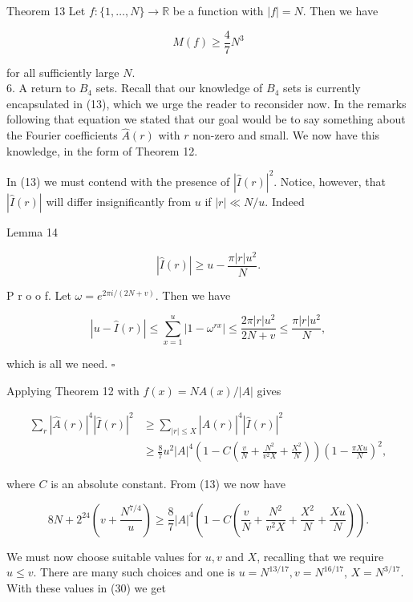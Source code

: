 \documentclass[10pt]{article}
\begin{document}
Theorem 13 Let $f:\{1, \ldots, N\} \rightarrow \mathbb{R}$ be a function with $|f|=N$. Then we have

$$
M(f) \geq \frac{4}{7} N^{3}
$$

for all sufficiently large $N$.\\
6. A return to $B_{4}$ sets. Recall that our knowledge of $B_{4}$ sets is currently encapsulated in (13), which we urge the reader to reconsider now. In the remarks following that equation we stated that our goal would be to say something about the Fourier coefficients $\hat{A}(r)$ with $r$ non-zero and small. We now have this knowledge, in the form of Theorem 12.

In (13) we must contend with the presence of $|\hat{I}(r)|^{2}$. Notice, however, that $|\hat{I}(r)|$ will differ insignificantly from $u$ if $|r| \ll N / u$. Indeed

Lemma 14

$$
|\hat{I}(r)| \geq u-\frac{\pi|r| u^{2}}{N} .
$$

P r o o f. Let $\omega=e^{2 \pi i /(2 N+v)}$. Then we have

$$
|u-\hat{I}(r)| \leq \sum_{x=1}^{u}\left|1-\omega^{r x}\right| \leq \frac{2 \pi|r| u^{2}}{2 N+v} \leq \frac{\pi|r| u^{2}}{N},
$$

which is all we need. \(\square\)

Applying Theorem 12 with $f(x)=N A(x) /|A|$ gives

$$
\begin{aligned}
\sum_{r}|\hat{A}(r)|^{4}|\hat{I}(r)|^{2} & \geq \sum_{|r| \leq X}|\hat{A}(r)|^{4}|\hat{I}(r)|^{2} \\
& \geq \frac{8}{7} u^{2}|A|^{4}\left(1-C\left(\frac{v}{N}+\frac{N^{2}}{v^{2} X}+\frac{X^{2}}{N}\right)\right)\left(1-\frac{\pi X u}{N}\right)^{2},
\end{aligned}
$$

where $C$ is an absolute constant. From (13) we now have


\begin{equation*}
8 N+2^{24}\left(v+\frac{N^{7 / 4}}{u}\right) \geq \frac{8}{7}|A|^{4}\left(1-C\left(\frac{v}{N}+\frac{N^{2}}{v^{2} X}+\frac{X^{2}}{N}+\frac{X u}{N}\right)\right) . \tag{30}
\end{equation*}


We must now choose suitable values for $u, v$ and $X$, recalling that we require $u \leq v$. There are many such choices and one is $u=N^{13 / 17}, v=N^{16 / 17}$, $X=N^{3 / 17}$. With these values in (30) we get
\end{document}
